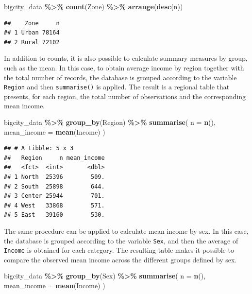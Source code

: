 \documentclass[
  english,
  12pt,
]{book}
\newenvironment{Shaded}{\begin{snugshade}}{\end{snugshade}}
\newcommand{\AttributeTok}[1]{\textcolor[rgb]{0.13,0.29,0.53}{#1}}
\newcommand{\FunctionTok}[1]{\textcolor[rgb]{0.13,0.29,0.53}{\textbf{#1}}}
\newcommand{\NormalTok}[1]{#1}
\newcommand{\SpecialCharTok}[1]{\textcolor[rgb]{0.81,0.36,0.00}{\textbf{#1}}}
\begin{document}
\begin{Shaded}
\begin{Highlighting}[]
\NormalTok{bigcity\_data }\SpecialCharTok{\%\textgreater{}\%}
  \FunctionTok{count}\NormalTok{(Zone) }\SpecialCharTok{\%\textgreater{}\%}
  \FunctionTok{arrange}\NormalTok{(}\FunctionTok{desc}\NormalTok{(n))}
\end{Highlighting}
\end{Shaded}

\begin{verbatim}
##    Zone     n
## 1 Urban 78164
## 2 Rural 72102
\end{verbatim}

In addition to counts, it is also possible to calculate summary measures by group, such as the mean. In this case, to obtain average income by region together with the total number of records, the database is grouped according to the variable \texttt{Region} and then \texttt{summarise()} is applied. The result is a regional table that presents, for each region, the total number of observations and the corresponding mean income.

\begin{Shaded}
\begin{Highlighting}[]
\NormalTok{bigcity\_data }\SpecialCharTok{\%\textgreater{}\%}
  \FunctionTok{group\_by}\NormalTok{(Region) }\SpecialCharTok{\%\textgreater{}\%}
  \FunctionTok{summarise}\NormalTok{(}
    \AttributeTok{n =} \FunctionTok{n}\NormalTok{(),}
    \AttributeTok{mean\_income =} \FunctionTok{mean}\NormalTok{(Income)}
\NormalTok{  )}
\end{Highlighting}
\end{Shaded}

\begin{verbatim}
## # A tibble: 5 x 3
##   Region     n mean_income
##   <fct>  <int>       <dbl>
## 1 North  25396        509.
## 2 South  25898        644.
## 3 Center 25944        701.
## 4 West   33868        571.
## 5 East   39160        530.
\end{verbatim}

The same procedure can be applied to calculate mean income by sex. In this case, the database is grouped according to the variable \texttt{Sex}, and then the average of \texttt{Income} is obtained for each category. The resulting table makes it possible to compare the observed mean income across the different groups defined by sex.

\begin{Shaded}
\begin{Highlighting}[]
\NormalTok{bigcity\_data }\SpecialCharTok{\%\textgreater{}\%}
  \FunctionTok{group\_by}\NormalTok{(Sex) }\SpecialCharTok{\%\textgreater{}\%}
  \FunctionTok{summarise}\NormalTok{(}
    \AttributeTok{n =} \FunctionTok{n}\NormalTok{(),}
    \AttributeTok{mean\_income =} \FunctionTok{mean}\NormalTok{(Income)}
\NormalTok{  )}
\end{Highlighting}
\end{Shaded}
\end{document}
